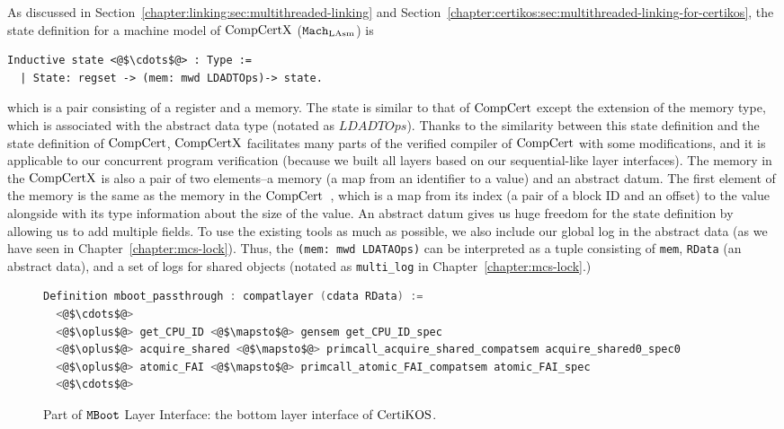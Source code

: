 As discussed in Section~\ref{chapter:linking:sec:multithreaded-linking} and Section~\ref{chapter:certikos:sec:multithreaded-linking-for-certikos},
the state definition for a machine model of  $\mathrm{CompCertX}$ (${\mathrm{\texttt{Mach}}}_{\mathrm{LAsm}}$) is
\begin{lstlisting}
Inductive state <@$\cdots$@> : Type :=
  | State: regset -> (mem: mwd LDADTOps)-> state.
\end{lstlisting}
which is a pair consisting of  a register and a memory. 
The state is similar to that of $\mathrm{CompCert}$ except the extension of the memory type, which is associated with 
the abstract data type  (notated as $LDADTOps$).
Thanks to the similarity between this state definition and the state definition of $\mathrm{CompCert}$, 
$\mathrm{CompCertX}$ facilitates many parts of the verified compiler of $\mathrm{CompCert}$ with some modifications, 
and it is applicable to our concurrent program verification (because 
we built all layers based on our sequential-like layer interfaces).
The memory in the $\mathrm{CompCertX}$   is also a pair of two elements--a memory (a map from an identifier to a value) and an abstract datum. 
The first element of the memory is the same as the memory in the $\mathrm{CompCert}$~\cite{leroy08},
 which is a map from its index (a pair of a block ID and an offset) to the value alongside with its type information about the size of the value. 
An abstract datum gives us huge freedom for the state definition by allowing us to add multiple fields.
To use the existing tools as much as possible, 
we also include our global log in the abstract data (as we have seen in Chapter~\ref{chapter:mcs-lock}).
Thus, the \lstinline$(mem: mwd LDATAOps)$ can be interpreted as a tuple consisting of 
\lstinline$mem$, \lstinline$RData$ (an abstract data), and a set of logs for shared objects (notated as \lstinline$multi_log$ in
Chapter~\ref{chapter:mcs-lock}.)


\begin{figure}
\begin{lstlisting}[language=C]
Definition mboot_passthrough : compatlayer (cdata RData) :=
  <@$\cdots$@>
  <@$\oplus$@> get_CPU_ID <@$\mapsto$@> gensem get_CPU_ID_spec
  <@$\oplus$@> acquire_shared <@$\mapsto$@> primcall_acquire_shared_compatsem acquire_shared0_spec0
  <@$\oplus$@> atomic_FAI <@$\mapsto$@> primcall_atomic_FAI_compatsem atomic_FAI_spec
  <@$\cdots$@>
\end{lstlisting}
\caption{Part of ${\mathrm{\texttt{MBoot}}}$ Layer Interface: the bottom layer interface of $\mathrm{CertiKOS}$.}
\label{fig:chapter:certikos:bottom-layer-interface}
\end{figure}

